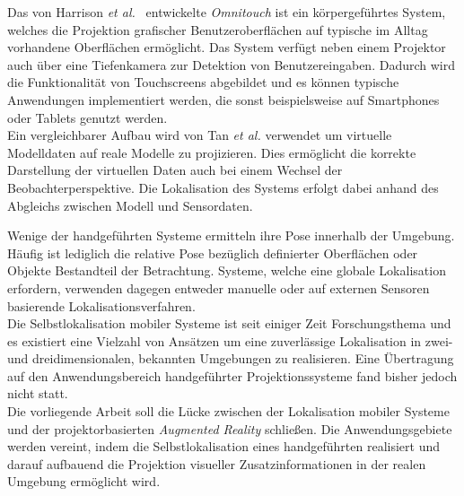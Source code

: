 Das von Harrison \textit{et al.\ }\cite{Harrison2011} entwickelte \textit{Omnitouch} ist ein körpergeführtes System, welches die Projektion grafischer Benutzeroberflächen auf typische im Alltag vorhandene Oberflächen ermöglicht. Das System verfügt neben einem Projektor auch über eine Tiefenkamera zur Detektion von Benutzereingaben. Dadurch wird die Funktionalität von Touchscreens abgebildet und es können typische Anwendungen implementiert werden, die sonst beispielsweise auf Smartphones oder Tablets genutzt werden.\\
Ein vergleichbarer Aufbau wird von Tan \textit{et al.} \cite{Tan2013} verwendet um virtuelle Modelldaten auf reale Modelle zu projizieren. Dies ermöglicht die korrekte Darstellung der virtuellen Daten auch bei einem Wechsel der Beobachterperspektive. Die Lokalisation des Systems erfolgt dabei anhand des Abgleichs zwischen Modell und Sensordaten.\\


Wenige der handgeführten Systeme ermitteln ihre Pose innerhalb der Umgebung. Häufig ist lediglich die relative Pose bezüglich definierter Oberflächen oder Objekte Bestandteil der Betrachtung. Systeme, welche eine globale Lokalisation erfordern, verwenden dagegen entweder manuelle oder auf externen Sensoren basierende Lokalisationsverfahren.\\
Die Selbstlokalisation mobiler Systeme ist seit einiger Zeit Forschungsthema und es existiert eine Vielzahl von Ansätzen um eine zuverlässige Lokalisation in zwei- und dreidimensionalen, bekannten Umgebungen zu realisieren. Eine Übertragung auf den Anwendungsbereich handgeführter Projektionssysteme fand bisher jedoch nicht statt.\\

Die vorliegende Arbeit soll die Lücke zwischen der Lokalisation mobiler Systeme und der projektorbasierten \textit{Augmented Reality} schließen. Die Anwendungsgebiete werden vereint, indem die Selbstlokalisation eines handgeführten  realisiert und darauf aufbauend die Projektion visueller Zusatzinformationen in der realen Umgebung ermöglicht wird.\\

\\

\\

